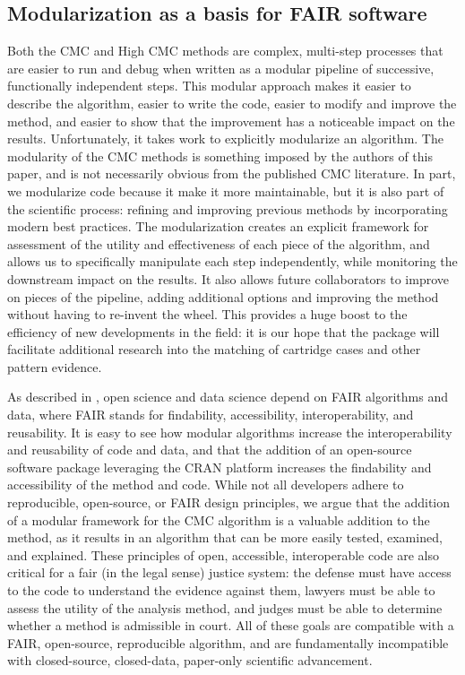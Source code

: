 \hypertarget{exploring}{%
\subsection{Modularization as a basis for FAIR
software}\label{exploring}}

Both the CMC and High CMC methods are complex, multi-step processes that
are easier to run and debug when written as a modular pipeline of
successive, functionally independent steps. This modular approach makes
it easier to describe the algorithm, easier to write the code, easier to
modify and improve the method, and easier to show that the improvement
has a noticeable impact on the results. Unfortunately, it takes work to
explicitly modularize an algorithm. The modularity of the CMC methods is
something imposed by the authors of this paper, and is not necessarily
obvious from the published CMC literature. In part, we modularize code
because it make it more maintainable, but it is also part of the
scientific process: refining and improving previous methods by
incorporating modern best practices. The modularization creates an
explicit framework for assessment of the utility and effectiveness of
each piece of the algorithm, and allows us to specifically manipulate
each step independently, while monitoring the downstream impact on the
results. It also allows future collaborators to improve on pieces of the
pipeline, adding additional options and improving the method without
having to re-invent the wheel. This provides a huge boost to the
efficiency of new developments in the field: it is our hope that the
 package will facilitate additional research into the
matching of cartridge cases and other pattern evidence.

As described in \citet{wittenburg_open_2021}, open science and data
science depend on FAIR algorithms and data, where FAIR stands for
findability, accessibility, interoperability, and reusability. It is
easy to see how modular algorithms increase the interoperability and
reusability of code and data, and that the addition of an open-source
software package leveraging the CRAN platform increases the findability
and accessibility of the method and code. While not all developers
adhere to reproducible, open-source, or FAIR design principles, we argue
that the addition of a modular framework for the CMC algorithm is a
valuable addition to the method, as it results in an algorithm that can
be more easily tested, examined, and explained. These principles of
open, accessible, interoperable code are also critical for a fair (in
the legal sense) justice system: the defense must have access to the
code to understand the evidence against them, lawyers must be able to
assess the utility of the analysis method, and judges must be able to
determine whether a method is admissible in court. All of these goals
are compatible with a FAIR, open-source, reproducible algorithm, and are
fundamentally incompatible with closed-source, closed-data, paper-only
scientific advancement.


